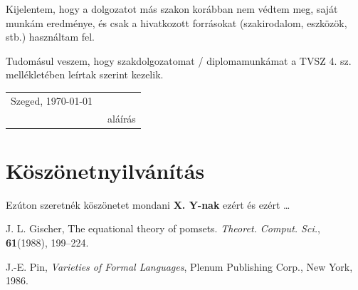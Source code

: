 \documentclass[12pt]{report}
\theoremstyle{definition}
\begin{document}
Kijelentem, hogy a dolgozatot más szakon korábban nem védtem meg, saját munkám eredménye, és csak a hivatkozott forrásokat (szakirodalom, eszközök, stb.) használtam fel.

Tudomásul veszem, hogy szakdolgozatomat / diplomamunkámat a TVSZ 4. sz. mellékletében leírtak szerint kezelik.

\vspace*{2cm}

\begin{tabular}{lc}
	Szeged, \today\
	\hspace{2cm} & \makebox[6cm]{\dotfill} \\
	             & aláírás                 \\
\end{tabular}





\chapter*{Köszönetnyilvánítás}

Ezúton szeretnék köszönetet mondani \textbf{X. Y-nak} ezért és ezért \ldots


%
%


\begin{thebibliography}{9}





	\bibitem{Gischer}
	J. L. Gischer,
	The equational theory of pomsets.
	\emph{Theoret. Comput. Sci.}, \textbf{61}(1988), 199--224.

	\bibitem{Pin}
	J.-E. Pin,
	\emph{Varieties of Formal Languages},
	Plenum Publishing Corp., New York, 1986.





\end{thebibliography}
\end{document}
